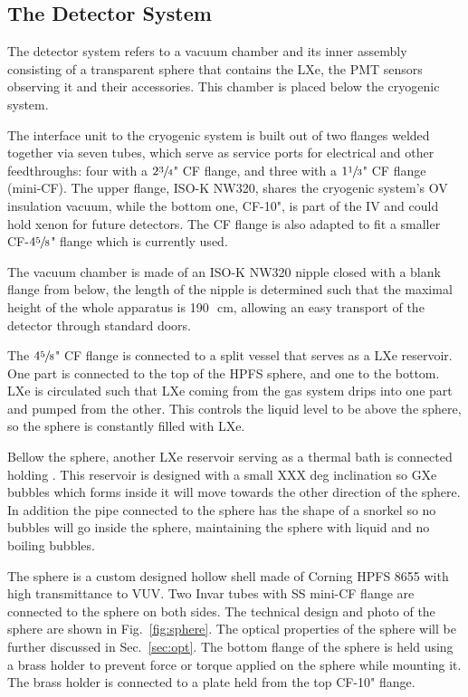 \subsection{The Detector System}
\label{subsec:det}
 
The detector system refers to a vacuum chamber and its inner assembly consisting of a transparent sphere that 
contains the LXe, the PMT sensors observing it and their accessories. This chamber is placed below the cryogenic system. 


The interface unit to the cryogenic system is built out of two flanges welded together via seven tubes, which serve as service ports for electrical and other feedthroughs: four with a $2 \sfrac{3}{4}$" CF flange, and three with a $1\sfrac{1}{3}$" CF flange (mini-CF). 
The upper flange, ISO-K NW320, shares the cryogenic system's OV insulation vacuum, while the bottom one, CF-10", is part of the IV and could hold xenon for future detectors. 
The CF flange is also adapted to fit a smaller CF-$4\sfrac{5}{8}$" flange which is currently used.

The vacuum chamber is made of an ISO-K NW320 nipple closed with a blank flange from below, 
the length of the nipple is determined such that the maximal height of the whole 
apparatus is 190~\,cm, allowing an easy transport of the detector through standard doors.
 
The $4\sfrac{5}{8}$" CF flange is connected to a split vessel that serves as a LXe reservoir. One part is connected 
to the top of the HPFS sphere, and one to the bottom. LXe is circulated such that LXe coming from the gas system drips into one part and pumped from the other. This controls the liquid level to be above the sphere, so the sphere is constantly filled with LXe. 

Bellow the sphere, another LXe reservoir serving as a thermal bath is connected holding . This reservoir is designed with a small XXX deg inclination so GXe bubbles which forms inside it will move towards the other direction of the sphere. In addition the pipe connected to the sphere has the shape of a snorkel so no bubbles will go inside the sphere, maintaining the sphere with liquid and no boiling bubbles.  


The sphere is a custom designed hollow shell made of Corning HPFS 8655 with high transmittance to VUV. Two Invar tubes with SS mini-CF flange are connected to the sphere on both sides. The technical design and photo of the sphere are shown in Fig.~\ref{fig:sphere}. The optical properties of the sphere will be further discussed in Sec.~\ref{sec:opt}. 
The bottom flange of the sphere is held using a brass holder to prevent 
force or torque applied on the sphere while mounting it. The 
brass holder is connected to a plate held from the top CF-10" flange. 



